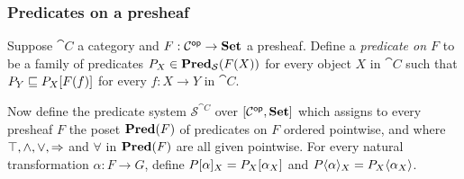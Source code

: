 \subsubsection{Predicates on a presheaf}

Suppose $\cat{C}$ a category and $F: \mathcal{C}^{\mathsf{op}} \to \mathbf{Set}$ a presheaf. Define a \emph{predicate on $F$} to be
a family of predicates $P_X \in \mathbf{Pred}_\mathcal{S}(F(X))$ for every object $X$ in $\cat{C}$ such that $P_Y
\sqsubseteq P_X[F(f)]$ for every $f: X \to Y$ in $\cat{C}$.

Now define the predicate system $\mathcal{S}^{\cat{C}}$ over $[\mathcal{C}^{\mathsf{op}},\mathbf{Set}]$ which assigns to every
presheaf $F$ the poset $\mathbf{Pred}(F)$ of predicates on $F$ ordered pointwise, and where $\top, \wedge, \vee,
\Rightarrow$ and $\forall$ in $\mathbf{Pred}(F)$ are all given pointwise. For every natural transformation $\alpha: F
\to G$, define $P[\alpha]_X = P_X[\alpha_X]$ and $P\langle\alpha\rangle_X =
P_X\langle\alpha_X\rangle$.
